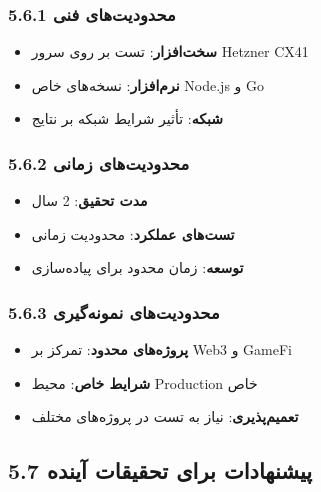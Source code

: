 \documentclass[
]{article}
\providecommand{\tightlist}{%
  \setlength{\itemsep}{0pt}\setlength{\parskip}{0pt}}
\begin{document}
\subsubsection{5.6.1 محدودیت‌های
فنی}\label{ux645ux62dux62fux648ux62fux6ccux62aux647ux627ux6cc-ux641ux646ux6cc-2}

\begin{itemize}
\tightlist
\item
  \textbf{سخت‌افزار}: تست بر روی سرور Hetzner CX41
\item
  \textbf{نرم‌افزار}: نسخه‌های خاص Node.js و Go
\item
  \textbf{شبکه}: تأثیر شرایط شبکه بر نتایج
\end{itemize}

\subsubsection{5.6.2 محدودیت‌های
زمانی}\label{ux645ux62dux62fux648ux62fux6ccux62aux647ux627ux6cc-ux632ux645ux627ux646ux6cc-2}

\begin{itemize}
\tightlist
\item
  \textbf{مدت تحقیق}: 2 سال
\item
  \textbf{تست‌های عملکرد}: محدودیت زمانی
\item
  \textbf{توسعه}: زمان محدود برای پیاده‌سازی
\end{itemize}

\subsubsection{5.6.3 محدودیت‌های
نمونه‌گیری}\label{ux645ux62dux62fux648ux62fux6ccux62aux647ux627ux6cc-ux646ux645ux648ux646ux647ux6afux6ccux631ux6cc}

\begin{itemize}
\tightlist
\item
  \textbf{پروژه‌های محدود}: تمرکز بر Web3 و GameFi
\item
  \textbf{شرایط خاص}: محیط Production خاص
\item
  \textbf{تعمیم‌پذیری}: نیاز به تست در پروژه‌های مختلف
\end{itemize}

\subsection{5.7 پیشنهادات برای تحقیقات
آینده}\label{ux67eux6ccux634ux646ux647ux627ux62fux627ux62a-ux628ux631ux627ux6cc-ux62aux62dux642ux6ccux642ux627ux62a-ux622ux6ccux646ux62fux647}
\end{document}
